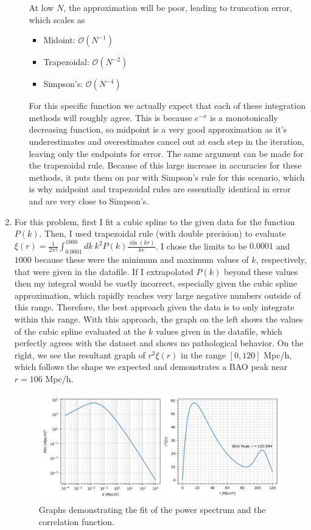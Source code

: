 \documentclass[11pt]{article}
\theoremstyle{theorem}
\theoremstyle{definition}
\theoremstyle{remark}
\begin{document}
\begin{enumerate}
\begin{enumerate}
    At low $N$, the approximation will be poor, leading to truncation error, which scales as
    \begin{itemize}
        \item Midoint: $\mathcal{O}(N^{-1})$
        \item Trapezoidal: $\mathcal{O}(N^{-2})$
        \item Simpson's: $\mathcal{O}(N^{-4})$
    \end{itemize}
    
    For this specific function we actually expect that each of these integration methods will roughly agree. This is because $e^{-x}$ is a monotonically decreasing function, so midpoint is a very good approximation as it's underestimates and overestimates cancel out at each step in the iteration, leaving only the endpoints for error. The same argument can be made for the trapezoidal rule. Because of this large increase in accuracies for these methods, it puts them on par with Simpson's rule for this scenario, which is why midpoint and trapezoidal rules are essentially identical in error and are very close to Simpson's.
    

\end{enumerate}

\item For this problem, first I fit a cubic spline to the given data for the function $P(k)$. Then, I used trapezoidal rule (with double precision) to evaluate $\xi(r) = \frac{1}{2\pi^2}\int_{0.0001}^{1000}dk\  k^2P(k)\frac{\sin(kr)}{kr}$. I chose the limits to be $0.0001$ and $1000$ because these were the minimum and maximum values of $k$, respectively, that were given in the datafile. If I extrapolated $P(k)$ beyond these values then my integral would be vastly incorrect, especially given the cubic spline approximation, which rapidly reaches very large negative numbers outside of this range. Therefore, the best approach given the data is to only integrate within this range. With this approach, the graph on the left shows the values of the cubic spline evaluated at the $k$ values given in the datafile, which perfectly agrees with the dataset and shows no pathological behavior. On the right, we see the resultant graph of $r^2\xi(r)$ in the range $[0,120]$ Mpc/h, which follows the shape we expected and demonstrates a BAO peak near $r = 106$ Mpc/h.
\begin{figure}[H]
    \centering
    \includegraphics[scale=0.65]{problem3.png}
    \caption{Graphs demonstrating the fit of the power spectrum and the correlation function.}
    \label{fig:my_label}
\end{figure}

\end{enumerate}
\end{document}
